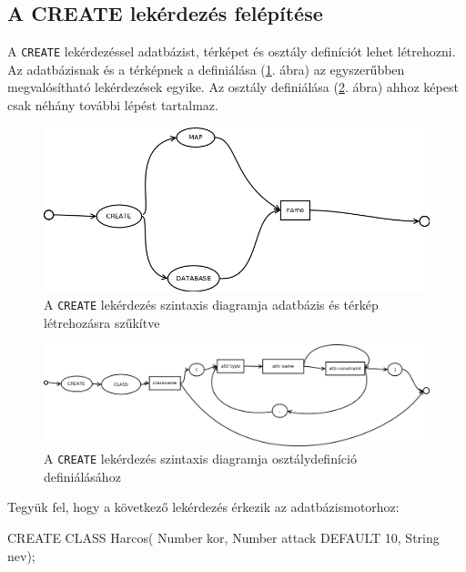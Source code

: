 \subsection{A CREATE lekérdezés felépítése}

A \texttt{CREATE} lekérdezéssel adatbázist, térképet és osztály definíciót lehet létrehozni. Az adatbázisnak és a térképnek a definiálása (\ref{fig:createSytnax}. ábra) az egyszerűbben megvalósítható lekérdezések egyike. Az osztály definiálása (\ref{fig:createClassSytnax}. ábra) ahhoz képest csak néhány további lépést tartalmaz.

\begin{figure}[htb]
	\begin{center}
		\includegraphics[scale=0.4]{images/create}
		\caption{A \texttt{CREATE} lekérdezés szintaxis diagramja adatbázis és térkép létrehozásra szűkítve}
		\label{fig:createSytnax}
	\end{center}
\end{figure}

\begin{figure}[htb]
	\begin{center}
		\includegraphics[scale=0.4]{images/createclass}
		\caption{A \texttt{CREATE} lekérdezés szintaxis diagramja osztálydefiníció definiálásához}
		\label{fig:createClassSytnax}
	\end{center}
\end{figure}

Tegyük fel, hogy a következő lekérdezés érkezik az adatbázismotorhoz:
\begin{sql}
CREATE CLASS Harcos(
Number kor,
Number attack DEFAULT 10,
String nev);
\end{sql}

